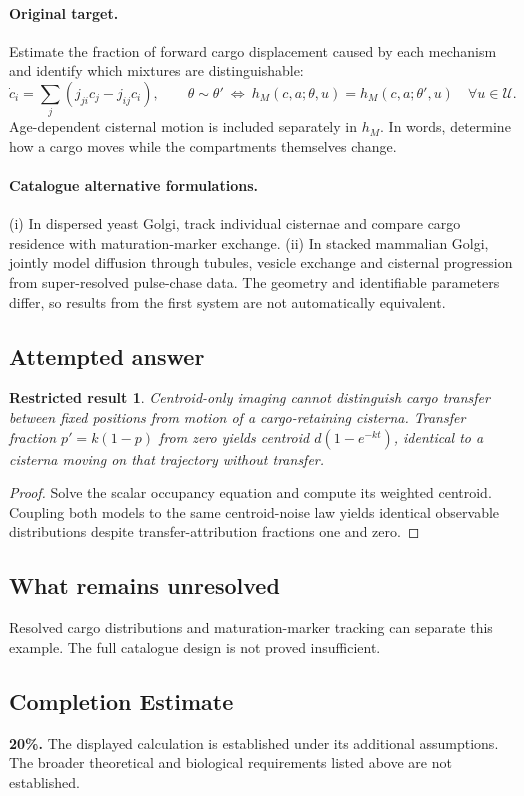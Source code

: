 \documentclass[11pt]{article}
\newtheorem{attemptresult}{Restricted result}[section]
\begin{document}
\paragraph{Original target.}
Estimate the fraction of forward cargo displacement caused by each mechanism and identify which mixtures are distinguishable:
\[
\dot c_i=\sum_j(j_{ji}c_j-j_{ij}c_i),\qquad
\theta\sim\theta'\ \Longleftrightarrow\ h_M(c,a;\theta,u)=h_M(c,a;\theta',u)
\quad\forall u\in\mathcal U.
\]
Age-dependent cisternal motion is included separately in $h_M$. In words, determine how a cargo moves while the compartments themselves change.
\paragraph{Catalogue alternative formulations.}
(i) In dispersed yeast Golgi, track individual cisternae and compare cargo residence with maturation-marker exchange. (ii) In stacked mammalian Golgi, jointly model diffusion through tubules, vesicle exchange and cisternal progression from super-resolved pulse-chase data. The geometry and identifiable parameters differ, so results from the first system are not automatically equivalent.
\subsection{Attempted answer}
\begin{attemptresult}
Centroid-only imaging cannot distinguish cargo transfer between fixed positions from motion of a cargo-retaining cisterna. Transfer fraction $p\prime=k(1-p)$ from zero yields centroid $d(1-e^{-kt})$, identical to a cisterna moving on that trajectory without transfer.
\end{attemptresult}
\begin{proof}
Solve the scalar occupancy equation and compute its weighted centroid. Coupling both models to the same centroid-noise law yields identical observable distributions despite transfer-attribution fractions one and zero.
\end{proof}
\subsection{What remains unresolved}
Resolved cargo distributions and maturation-marker tracking can separate this example. The full catalogue design is not proved insufficient.
\subsection{Completion Estimate}
\textbf{20\%.} The displayed calculation is established under its additional assumptions. The broader theoretical and biological requirements listed above are not established.
\end{document}

